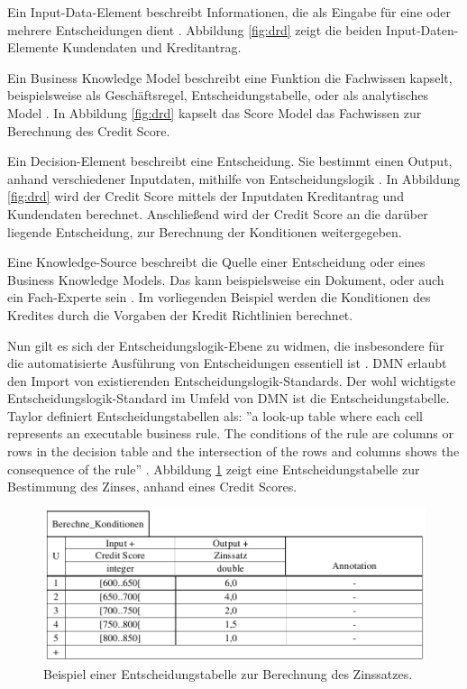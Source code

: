 \begin{itemize*}

\item Ein Input-Data-Element beschreibt Informationen, die als Eingabe für eine oder mehrere Entscheidungen dient \cite[vgl. S. 30]{OM16}. Abbildung \ref{fig:drd} zeigt die beiden Input-Daten-Elemente Kundendaten und Kreditantrag. 

\item Ein Business Knowledge Model beschreibt eine Funktion die Fachwissen kapselt, beispielsweise als Geschäftsregel, Entscheidungstabelle, oder als analytisches Model \cite[vgl. S. 30]{OM16}. In Abbildung \ref{fig:drd} kapselt das Score Model das Fachwissen zur Berechnung des Credit Score.

\item Ein Decision-Element beschreibt eine Entscheidung. Sie bestimmt einen Output, anhand verschiedener Inputdaten, mithilfe von Entscheidungslogik \cite[vgl. S. 20]{OM16}. In Abbildung \ref{fig:drd} wird der Credit Score mittels der Inputdaten Kreditantrag und Kundendaten berechnet. Anschließend wird der Credit Score an die darüber liegende Entscheidung, zur Berechnung der Konditionen weitergegeben.  

\item Eine Knowledge-Source beschreibt die Quelle einer Entscheidung oder eines Business Knowledge Models. Das kann beispielsweise ein Dokument, oder auch ein Fach-Experte sein \cite[vgl. S. 18]{OM16}. Im vorliegenden Beispiel werden die Konditionen des Kredites durch die Vorgaben der Kredit Richtlinien berechnet.

\end{itemize*}

Nun gilt es sich der Entscheidungslogik-Ebene zu widmen, die insbesondere für die automatisierte Ausführung von Entscheidungen essentiell ist \cite[vgl. S. 18]{OM16}. DMN erlaubt den Import von existierenden Entscheidungslogik-Standards. Der wohl wichtigste Entscheidungslogik-Standard im Umfeld von DMN ist die Entscheidungstabelle. Taylor definiert Entscheidungstabellen als: ''a look-up table where each cell represents an executable business rule. The conditions of the rule are columns or rows in the decision table and the intersection of the rows and columns shows the consequence of the rule'' \cite[S. 132]{JT11}. Abbildung \ref{fig:decisiontable} zeigt eine Entscheidungstabelle zur Bestimmung des Zinses, anhand eines Credit Scores.

\begin{figure}[ht]
\centering
\includegraphics{images/decisiontable.pdf}
\caption{Beispiel einer Entscheidungstabelle zur Berechnung des Zinssatzes.}
\label{fig:decisiontable}
\end{figure} 

